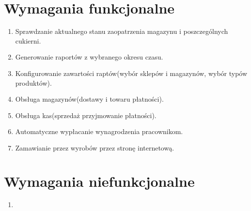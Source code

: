 \documentclass[16pt,a4paper]{article}
\begin{document}
\section{Wymagania funkcjonalne}
\begin{enumerate}
\item Sprawdzanie aktualnego stanu zaopatrzenia magazynu i poszczególnych cukierni.
\item Generowanie raportów z wybranego okresu czasu.
\item Konfigurowanie zawartości raptów(wybór sklepów i magazynów, wybór typów produktów).
\item Obsługa magazynów(dostawy i towaru płatności).
\item Obsługa kas(sprzedaż przyjmowanie płatności).
\item Automatyczne wypłacanie wynagrodzenia pracownikom.
\item Zamawianie przez wyrobów przez stronę internetową. 
\end{enumerate}
\section{Wymagania niefunkcjonalne}
\begin{enumerate}
\item 
\end{enumerate}
\end{document}
